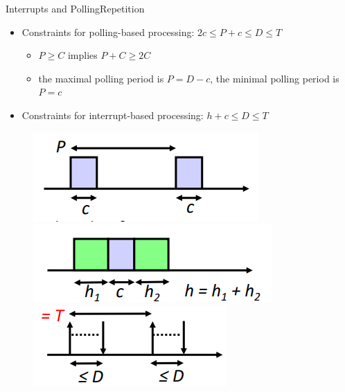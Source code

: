 \begin{frame}{Interrupts and Polling}{Repetition}
  \begin{itemize}
    \item \alert{Constraints for polling-based processing:} $2c \le P+c \le D \le T$
      \begin{itemize}
        \item  $P \ge C$ implies $P + C \ge 2C$
        \item the \alert{maximal polling period} is $P = D-c$, the \alert{minimal polling period} is $P = c$
      \end{itemize}
    \item \alert{Constraints for interrupt-based processing:} $h+c \le D\le T$
  \end{itemize}
  \begin{figure}
    \centering
    \includegraphics[width=0.2\paperwidth]{./figures/polling_based.png}
    \includegraphics[width=0.2\paperwidth]{./figures/interrupt_based.png}
    \includegraphics[width=0.2\paperwidth]{./figures/deadline.png}
  \end{figure}
\end{frame}

\setcounter{task}{1}

